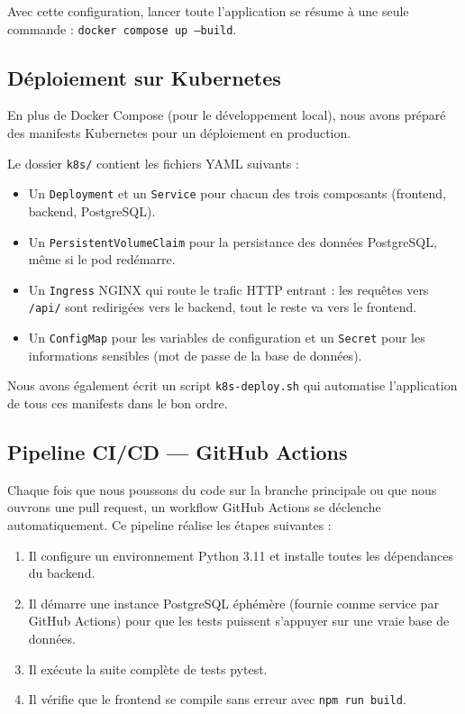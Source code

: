 \documentclass[12pt,a4paper]{article}
\begin{document}
Avec cette configuration, lancer toute l'application se résume à une seule
commande : \texttt{docker compose up --build}.

\subsection{Déploiement sur Kubernetes}

En plus de Docker Compose (pour le développement local), nous avons préparé
des manifests Kubernetes pour un déploiement en production.

Le dossier \texttt{k8s/} contient les fichiers YAML suivants :
\begin{itemize}
  \item Un \texttt{Deployment} et un \texttt{Service} pour chacun des trois
        composants (frontend, backend, PostgreSQL).
  \item Un \texttt{PersistentVolumeClaim} pour la persistance des données
        PostgreSQL, même si le pod redémarre.
  \item Un \texttt{Ingress} NGINX qui route le trafic HTTP entrant : les
        requêtes vers \texttt{/api/} sont redirigées vers le backend,
        tout le reste va vers le frontend.
  \item Un \texttt{ConfigMap} pour les variables de configuration et un
        \texttt{Secret} pour les informations sensibles (mot de passe de
        la base de données).
\end{itemize}

Nous avons également écrit un script \texttt{k8s-deploy.sh} qui automatise
l'application de tous ces manifests dans le bon ordre.

\subsection{Pipeline CI/CD — GitHub Actions}

Chaque fois que nous poussons du code sur la branche principale ou que nous
ouvrons une pull request, un workflow GitHub Actions se déclenche
automatiquement. Ce pipeline réalise les étapes suivantes :

\begin{enumerate}
  \item Il configure un environnement Python 3.11 et installe toutes les
        dépendances du backend.
  \item Il démarre une instance PostgreSQL éphémère (fournie comme service
        par GitHub Actions) pour que les tests puissent s'appuyer sur une
        vraie base de données.
  \item Il exécute la suite complète de tests pytest.
  \item Il vérifie que le frontend se compile sans erreur avec
        \texttt{npm run build}.
\end{enumerate}
\end{document}
